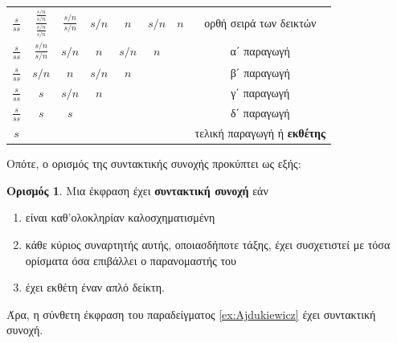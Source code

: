 \documentclass [a4paper,11pt] {book}
\theoremstyle{definition}
\theoremstyle{definition}
\newtheorem{definition}[theorem]{Ορισμός}
\begin{document}
\begin{center}
\begin{tabular}{cccccccc}

$\frac{s}{ss}$ &  $\frac{\frac{s/n}{s/n}}{\frac{s/n}{s/n}}$ & $\frac{s/n}{s/n}$ & $s/n$ & $n$ & $s/n$ & $n$ & ορθή σειρά των δεικτών \\ 

$\frac{s}{ss}$ & $\frac{s/n}{s/n}$ & $s/n$ & $n$ & $s/n$ & $n$ & & α΄ παραγωγή \\ 

$\frac{s}{ss}$ & $s/n$ & $n$ & $s/n$ & $n$ & & & β΄ παραγωγή \\ 

$\frac{s}{ss}$ & $s$ & $s/n$ & $n$ & & & & γ΄ παραγωγή\\ 

$\frac{s}{ss}$ & $s$ & $s$ & & & & & δ΄ παραγωγή \\ 

$s$ & & & & & & & τελική παραγωγή ή \textbf{εκθέτης}\\ 
\end{tabular}
\end{center}
Οπότε, ο ορισμός της συντακτικής συνοχής προκύπτει ως εξής:
\begin{definition}
\label{syntacticalCoherence}
Μια έκφραση έχει \textbf{συντακτική συνοχή} εάν
\begin{enumerate}
\item είναι καθ'ολοκληρίαν καλοσχηματισμένη
\item κάθε κύριος συναρτητής αυτής, οποιασδήποτε τάξης, έχει συσχετιστεί με τόσα ορίσματα όσα επιβάλλει ο παρανομαστής του
\item έχει εκθέτη έναν απλό δείκτη.
\end{enumerate}
\end{definition}
Άρα, η σύνθετη έκφραση του παραδείγματος \ref{ex:Ajdukiewicz} έχει συντακτική συνοχή.
\end{document}
